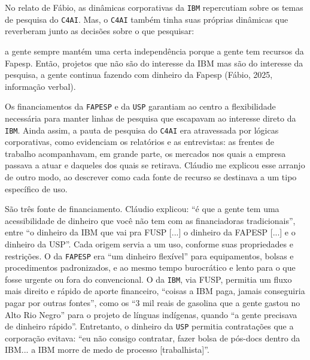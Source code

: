No relato de Fábio, as dinâmicas corporativas da \texttt{IBM} repercutiam sobre os temas de pesquisa do \texttt{C4AI}. Mas, o \texttt{C4AI} também tinha suas próprias dinâmicas que reverberam junto as decisões sobre o que pesquisar: 

\begin{citacaoabnt}
[...] a gente sempre mantém uma certa independência porque a gente tem recursos da Fapesp. Então, projetos que não são do interesse da IBM mas são do interesse da pesquisa, a gente continua fazendo com dinheiro da Fapesp (Fábio, 2025, informação verbal).
\end{citacaoabnt} 

Os financiamentos da \texttt{FAPESP} e da \texttt{USP} garantiam ao centro a flexibilidade necessária para manter linhas de pesquisa que escapavam ao interesse direto da \texttt{IBM}. Ainda assim, a pauta de pesquisa do \texttt{C4AI} era atravessada por lógicas corporativas, como evidenciam os relatórios e as entrevistas: as frentes de trabalho acompanhavam, em grande parte, os mercados nos quais a empresa passava a atuar e daqueles dos quais se retirava. Cláudio me explicou esse arranjo de outro modo, ao descrever como cada fonte de recurso se destinava a um tipo específico de uso.

São três fonte de financiamento. Cláudio explicou: \enquote{é que a gente tem uma acessibilidade de dinheiro que você não tem com as financiadoras tradicionais}, entre \enquote{o dinheiro da IBM que vai pra FUSP [...] o dinheiro da FAPESP [...] e o dinheiro da USP}. Cada origem servia a um uso, conforme suas propriedades e restrições. O da \texttt{FAPESP} era \enquote{um dinheiro flexível} para equipamentos, bolsas e procedimentos padronizados, e ao mesmo tempo burocrático e lento para o que fosse urgente ou fora do convencional. O da \texttt{IBM}, via FUSP, permitia um fluxo mais direito e rápido de aporte financeiro, \enquote{coisas a IBM paga, jamais conseguiria pagar por outras fontes}, como os \enquote{3 mil reais de gasolina que a gente gastou no Alto Rio Negro} para o projeto de línguas indígenas, quando \enquote{a gente precisava de dinheiro rápido}.  Entretanto, o dinheiro da \texttt{USP} permitia contratações que a corporação evitava: \enquote{eu não consigo contratar, fazer bolsa de pós-docs dentro da IBM... a IBM morre de medo de processo [trabalhista]}.

